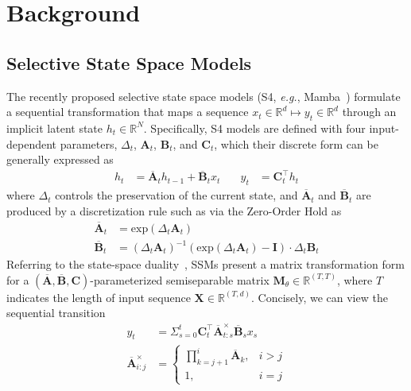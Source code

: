 \section{Background}
\label{sec:preliminaries}

\subsection{Selective State Space Models}
The recently proposed selective state space models (S4, \textit{e.g.}, Mamba~\citep{gu2023mamba,dao2024mamba2}) formulate a sequential transformation that maps a sequence $x_{t} \in \mathbb{R}^{d} \mapsto y_{t} \in \mathbb{R}^{d}$ through an implicit latent state $h_{t} \in \mathbb{R}^{N}$. Specifically, S4 models are defined with four input-dependent parameters, $\Delta_{t}$, $\mathbf{A}_{t}$, $\mathbf{B}_{t}$, and $\mathbf{C}_{t}$, which their discrete form can be generally expressed as 
\begin{equation}
\begin{aligned}
    h_{t} &= \overline{\mathbf{A}}_{t}h_{t-1} + \overline{\mathbf{B}}_{t}x_{t} \quad & 
    y_{t} &= \mathbf{C}^{\top}_{t}h_{t}
\end{aligned}
\end{equation}
where $\Delta_{t}$ controls the preservation of the current state, and $\overline{\mathbf{A}}_{t}$ and $\overline{\mathbf{B}}_{t}$ are produced by a discretization rule such as via the Zero-Order Hold as
\begin{equation}
\begin{aligned}
    \overline{\mathbf{A}}_{t} &= \text{exp}(\Delta_{t}\mathbf{A}_{t}) \\
    \overline{\mathbf{B}}_{t} &= (\Delta_{t}\mathbf{A}_{t})^{-1}(\text{exp}(\Delta_{t}\mathbf{A}_{t})-\mathbf{I})\cdot\Delta_{t}\mathbf{B}_{t}
\end{aligned}
\end{equation}
Referring to the state-space duality~\citep{dao2024mamba2,hwang2024hydra}, SSMs present a matrix transformation form for a $({\overline{\mathbf{A}},\overline{\mathbf{B}},\mathbf{C}})$-parameterized semiseparable matrix $\mathbf{M}_{\theta} \in \mathbb{R}^{(T,T)}$, where $T$ indicates the length of input sequence $\mathbf{X} \in \mathbb{R}^{(T,d)}$. Concisely, we can view the sequential transition
\begin{equation}
\begin{aligned}
    y_{t} &= \Sigma^{t}_{s=0}\mathbf{C}^{\top}_{t}\overline{\mathbf{A}}^{\times}_{t:s}\overline{\mathbf{B}}_{s}x_{s} \\
    \overline{\mathbf{A}}^{\times}_{i:j}&=\begin{cases}
    \prod^{i}_{k=j+1}\overline{\mathbf{A}}_{k},     & i>j \\
    1, & i=j
\end{cases}
\end{aligned}
\end{equation}
